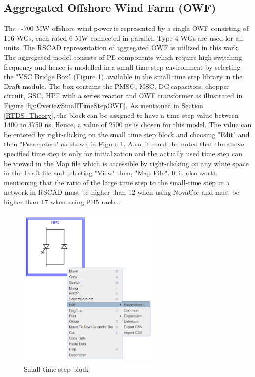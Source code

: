 \subsection{Aggregated Offshore Wind Farm (OWF)}\label{OWF}

The $\sim{700}$ MW offshore wind power is represented by a single \gls{OWF} consisting of 116 \gls{WG}s, each rated 6 MW connected in parallel. Type-4 \gls{WG}s are used for all units. The RSCAD representation of aggregated \gls{OWF} is utilized in this work. The aggregated model consists of \gls{PE} components which require high switching frequency %
and hence is modelled in a small time step environment by selecting the "VSC Bridge Box" (Figure \ref{fig:SmallTimeStepBlock}) available in the small time step library in the Draft module. The box contains the \gls{PMSG}, \gls{MSC}, \gls{DC} capacitors, chopper circuit, \gls{GSC}, \gls{HPF} with a series reactor and \gls{OWF} transformer as illustrated in Figure \ref{fig:OveriewSmallTimeStepOWF}. As mentioned in Section \ref{RTDS_Theory}, the block can be assigned to have a time step value between 1400 to 3750 ns. Hence, a value of 2500 ns is chosen for this model. 
The value can be entered by right-clicking on the small time step block and choosing "Edit" and then "Parameters" as shown in Figure \ref{fig:SmallTimeStepBlock}. Also, it must the noted that the above specified time step is only for initialization and the actually used time step can be viewed in the Map file which is accessible by right-clicking on any white space in the Draft file and selecting "View" then, "Map File". It is also worth mentioning that the ratio of the large time step to the small-time step in a network in RSCAD must be higher than 12 when using NovaCor and must be higher than 17 when using PB5 racks \cite{rtds_tech}. 

\begin{figure}[H]
\centering
    \includegraphics[height = 8cm,width = 7cm]{Diagrams/Chapter_3/SmallTimeStepBlock.PNG}
    \caption{Small time step block}
    \label{fig:SmallTimeStepBlock}
\end{figure}

